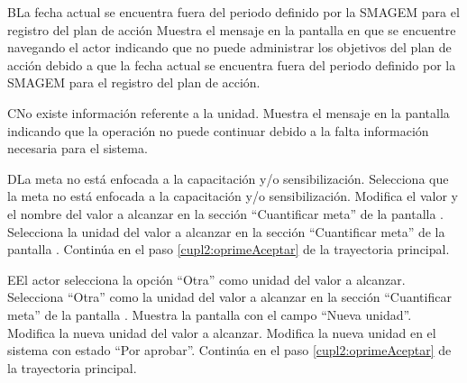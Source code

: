    \begin{UCtrayectoriaA}{B}{La fecha actual se encuentra fuera del periodo definido por la SMAGEM para el registro del plan de acción}
    \UCpaso[\UCsist] Muestra el mensaje  en la pantalla en que se encuentre navegando el actor indicando que no puede administrar los objetivos del plan de acción debido a que la fecha actual se encuentra fuera del periodo definido por la SMAGEM para el registro del plan de acción.
 \end{UCtrayectoriaA}
  
\begin{UCtrayectoriaA}{C}{No existe información referente a la unidad.}
	\UCpaso[\UCsist] Muestra el mensaje  en la pantalla  indicando que la operación no puede continuar debido a la falta información necesaria para el sistema.
\end{UCtrayectoriaA}

\begin{UCtrayectoriaA}{D}{La meta no está enfocada a la capacitación y/o sensibilización.}
	\UCpaso[\UCactor] Selecciona que la meta no está enfocada a la capacitación y/o sensibilización. 
	\UCpaso[\UCactor] Modifica el valor y el nombre del valor a alcanzar en la sección ``Cuantificar meta'' de la pantalla .
	\UCpaso[\UCactor] Selecciona la unidad del valor a alcanzar en la sección ``Cuantificar meta'' de la pantalla . 
	\UCpaso[] Continúa en el paso \ref{cupl2:oprimeAceptar} de la trayectoria principal.
\end{UCtrayectoriaA}

\begin{UCtrayectoriaA}{E}{El actor selecciona la opción ``Otra'' como unidad del valor a alcanzar.}
	\UCpaso[\UCactor] Selecciona ``Otra'' como la unidad del valor a alcanzar en la sección ``Cuantificar meta'' de la pantalla .
	\UCpaso[\UCsist] Muestra la pantalla   con el campo ``Nueva unidad''.
	\UCpaso[\UCactor] Modifica la nueva unidad del valor a alcanzar.
	\UCpaso[\UCsist] Modifica la nueva unidad en el sistema con estado ``Por aprobar''.
	\UCpaso[] Continúa en el paso \ref{cupl2:oprimeAceptar} de la trayectoria principal.
\end{UCtrayectoriaA} 

